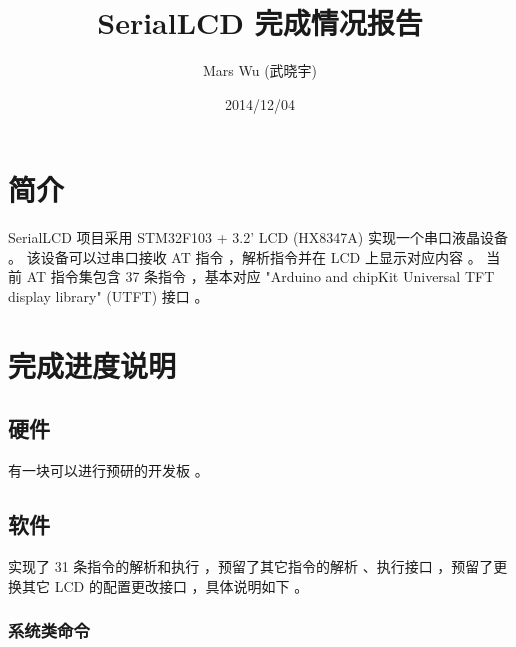 \documentclass{article}
\begin{document}
\title{SerialLCD 完成情况报告}
\author{Mars Wu (武晓宇)}
\date{2014/12/04}
\maketitle

\section{简介}
\label{简介}

SerialLCD 项目采用 STM32F103 + 3.2' LCD (HX8347A) 实现一个串口液晶设备 。
该设备可以过串口接收 AT 指令 ，解析指令并在 LCD 上显示对应内容 。
当前 AT 指令集包含 37 条指令 ，基本对应 "Arduino and chipKit Universal TFT display library"\cite{UTFT} (UTFT) 接口 。

\section{完成进度说明}
\label{sec:完成进度说明}

\subsection{硬件}
\label{sec:硬件}

有一块可以进行预研的开发板 。

\subsection{软件}
\label{sec:软件}

实现了 31 条指令的解析和执行 ，预留了其它指令的解析 、执行接口 ，预留了更换其它 LCD 的配置更改接口 ，具体说明如下 。

\subsubsection{系统类命令}
\label{sec:系统类命令}
\end{document}
